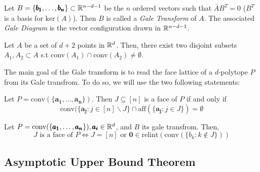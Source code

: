 \begin{definition}
    Let $B = \{ \pmb{b_1}, \dots, \pmb{b_n} \} \subset \mathbb{R}^{n -d -1}$ be the $n$ ordered vectors such that $\bar{A} B^T = 0$ ($B^T$ is a basis for $\text{ker}(A)$).
    Then $B$ is called a \textit{Gale Transform} of $A$.
    The associated \textit{Gale Diagram} is the vector configuration drawn in $\mathbb{R}^{n -d -1}$.
\end{definition}

\begin{lemma}
    Let $A$ be a set of $d+2$ points in $\mathbb{R}^d$. Then, there exist two disjoint subsets $A_1, A_2 \subset A$ s.t conv$(A_1) \cap \text{conv}(A_2) \neq \emptyset$.
\end{lemma}

The main goal of the Gale transform is to read the face lattice of a $d$-polytope $P$ from its Gale transfrom.
To do so, we will use the two following statements:

\begin{lemma}
    Let $P = \text{conv}(\{\pmb{a_1}, \dots, \pmb{a_n}\})$. Then $J \subseteq [n]$ is a face of $P$ if and only if
    $$\text{conv}(\{\pmb{a_j} : j \in [n] \backslash J \} \cap \text{aff}(\{\pmb{a_j} : j \in J \}) = \emptyset$$
\end{lemma}
\begin{theorem}
    Let $P = \text{conv}(\{\pmb{a_1}, \dots, \pmb{a_n}\}), \pmb{a_i} \in \mathbb{R}^{d}$, and $B$ its gale transfrom.
    Then,
    $$J \text{ is a face of } P \Leftrightarrow J = [n] \text{ or } \pmb{0} \in \text{relint}(\text{conv}(\{b_k : k \not\in J \}))$$
\end{theorem}

\subsection{Asymptotic Upper Bound Theorem}
